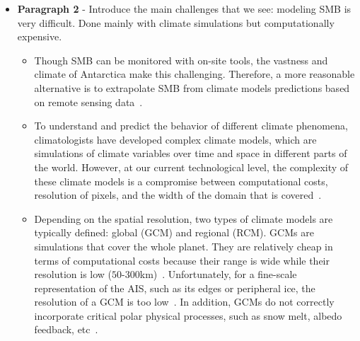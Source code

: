 \documentclass[a4paper,11pt,oneside]{report}
\begin{document}
\begin{itemize}
    
    \item \textbf{Paragraph 2} - Introduce the main challenges that we see: modeling SMB is very difficult. Done mainly with climate simulations but computationally expensive. 
    \begin{itemize}
        \item Though SMB can be monitored with on-site tools, the vastness and climate of Antarctica make this challenging. Therefore, a more reasonable alternative is to extrapolate SMB from climate models predictions based on remote sensing data~\cite{Mottram, Lenaerts2019}.  
        \item To understand and predict the behavior of different climate phenomena, climatologists have developed complex climate models, which are simulations of climate variables over time and space in different parts of the world. However, at our current technological level, the complexity of these climate models is a compromise between computational costs, resolution of pixels, and the width of the domain that is covered~\cite{Doury}. 
        \item Depending on the spatial resolution, two types of climate models are typically defined: global (GCM) and regional (RCM). GCMs are simulations that cover the whole planet. They are relatively cheap in terms of computational costs because their range is wide while their resolution is low ($50$-$300$\si{km})~\cite{Doury}. Unfortunately, for a fine-scale representation of the AIS, such as its edges or peripheral ice, the resolution of a GCM is too low~\cite{Kittel, Seroussi}. In addition, GCMs do not correctly incorporate critical polar physical processes, such as snow melt, albedo feedback, etc~\cite{Kittel, Lenaerts2016}. 
        

\end{itemize}
\end{itemize}
\end{document}

